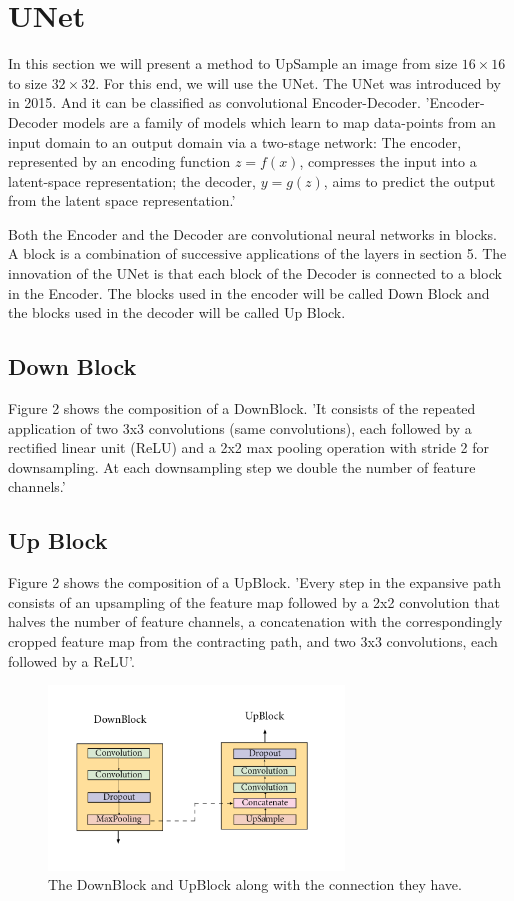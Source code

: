 \documentclass{article}
\theoremstyle{definition}
\begin{document}
\section{UNet}
In this section we will present a method to UpSample an image from size $16\times 16$ to size $32\times 32$. For this end, we will use the UNet. The UNet was introduced by in 2015. And it can be classified as convolutional Encoder-Decoder. 'Encoder-Decoder models are a family of models which learn to map data-points from an input domain to an output domain via a two-stage network: The encoder, represented by an encoding function $z = f(x)$, compresses the input into a latent-space representation; the decoder, $y = g(z)$, aims to predict the output from the latent space representation.'\cite{Minaee}

\noindent
Both the Encoder and the Decoder are convolutional neural networks in blocks. A block is a combination of successive applications of the layers in section 5. The innovation of the UNet is that each block of the Decoder is connected to a block in the Encoder. The blocks used in the encoder will be called Down Block and the blocks used in the decoder will be called Up Block.

\subsection{Down Block}
Figure 2 shows the composition of a DownBlock.  'It consists of the repeated application of two 3x3 convolutions (same convolutions), each followed by a rectified linear unit (ReLU) and a 2x2 max pooling operation with stride 2 for downsampling. At each downsampling step we double the number of feature channels.'\cite{Ronneberger}

\subsection{Up Block}
Figure 2 shows the composition of a UpBlock. 'Every step in the expansive path consists of an upsampling of the feature map followed by a 2x2 convolution that halves the number of feature channels, a concatenation with the correspondingly cropped
feature map from the contracting path, and two 3x3 convolutions, each followed by a ReLU'.\cite{Ronneberger}

\begin{figure}[h]
    \centering
    \includegraphics[width=0.7\textwidth]{Imagenes/DownUp.png}
    \caption{The DownBlock and UpBlock along with the connection they have.}
    \label{fig:mesh1}
\end{figure}
\end{document}
